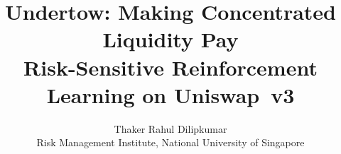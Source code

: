 \documentclass[11pt,a4paper]{article}
\title{Undertow: Making Concentrated Liquidity Pay\\[0.4em]
  \large Risk-Sensitive Reinforcement Learning on Uniswap~v3}
\author{Thaker Rahul Dilipkumar\\[0.2em]
  \small Risk Management Institute, National University of Singapore}
\date{}
\begin{document}


\maketitle

\begin{abstract}

\end{abstract}

\clearpage
\tableofcontents











\clearpage


\clearpage



\clearpage
\appendix







\end{document}
